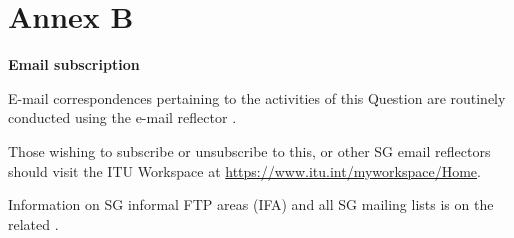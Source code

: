 
\clearpage
\section*{Annex B}\label{annex-b}

\begin{center}
\textbf{Email subscription}
\end{center}



E-mail correspondences pertaining to the activities of this Question are routinely conducted using the e-mail reflector .

Those wishing to subscribe or unsubscribe to this, or other SG\studyGroup{} email reflectors should visit the ITU Workspace at \href{https://www.itu.int/myworkspace/Home}{https://www.itu.int/myworkspace/Home}.

Information on SG\studyGroup{} informal FTP areas (IFA) and all SG\studyGroup{} mailing lists is on the related {\ifaUrl}.
